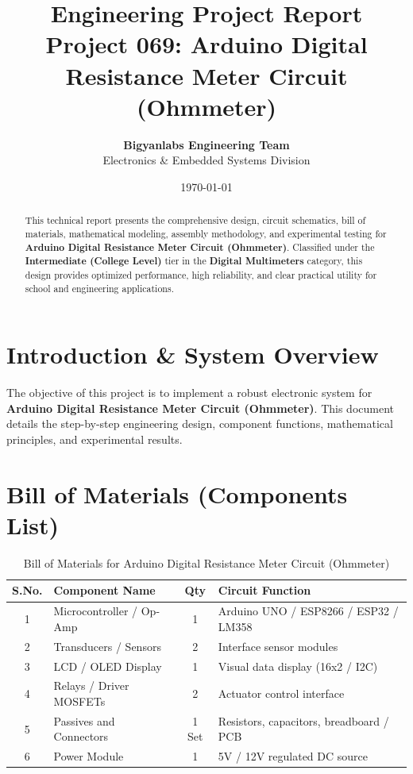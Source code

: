 \documentclass[11pt,a4paper]{article}
\title{\textbf{\Huge Engineering Project Report}\\[0.5em] \Large Project 069: Arduino Digital Resistance Meter Circuit (Ohmmeter)}
\author{\textbf{Bigyanlabs Engineering Team}\\ Electronics \& Embedded Systems Division}
\date{\today}
\begin{document}
\maketitle
\thispagestyle{empty}

\begin{abstract}
This technical report presents the comprehensive design, circuit schematics, bill of materials, mathematical modeling, assembly methodology, and experimental testing for \textbf{Arduino Digital Resistance Meter Circuit (Ohmmeter)}. Classified under the \textbf{Intermediate (College Level)} tier in the \textbf{Digital Multimeters} category, this design provides optimized performance, high reliability, and clear practical utility for school and engineering applications.
\end{abstract}

\newpage
\tableofcontents
\newpage

\section{Introduction \& System Overview}
The objective of this project is to implement a robust electronic system for \textbf{Arduino Digital Resistance Meter Circuit (Ohmmeter)}. This document details the step-by-step engineering design, component functions, mathematical principles, and experimental results.

\section{Bill of Materials (Components List)}
\begin{table}[h!]
\centering
\caption{Bill of Materials for Arduino Digital Resistance Meter Circuit (Ohmmeter)}
\vspace{0.5em}
\begin{tabular}{clcp{7cm}}
\toprule
\textbf{S.No.} & \textbf{Component Name} & \textbf{Qty} & \textbf{Circuit Function} \\
\midrule
1 & Microcontroller / Op-Amp & 1 & Arduino UNO / ESP8266 / ESP32 / LM358 \\
2 & Transducers / Sensors & 2 & Interface sensor modules \\
3 & LCD / OLED Display & 1 & Visual data display (16x2 / I2C) \\
4 & Relays / Driver MOSFETs & 2 & Actuator control interface \\
5 & Passives and Connectors & 1 Set & Resistors, capacitors, breadboard / PCB \\
6 & Power Module & 1 & 5V / 12V regulated DC source \\
\bottomrule
\end{tabular}
\end{table}
\end{document}
